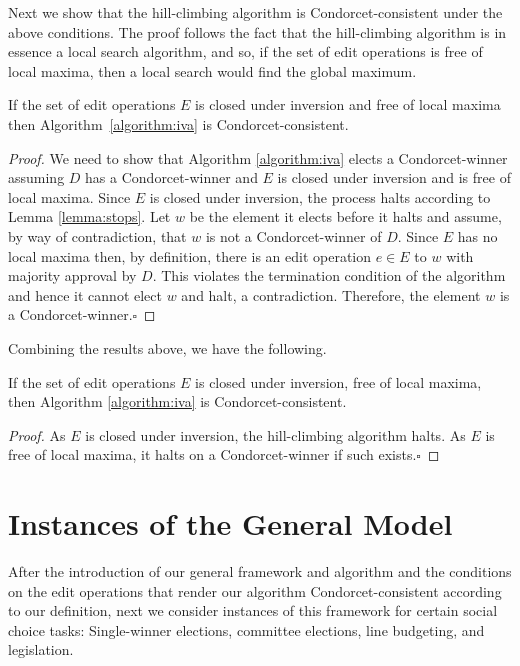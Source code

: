 \documentclass[sigconf]{aamas}  %
\newcommand{\qqed}{\hfill$\square$}
\begin{document}
Next we show that the hill-climbing algorithm is Condorcet-consistent under the above conditions. The proof follows the fact that the hill-climbing algorithm is in essence a local search algorithm, and so, if the set of edit operations is free of local maxima, then a local search would find the global maximum.

\begin{lemma}\label{lemma:IIAV-epsilon-condorcet}
If the set of edit operations $E$ is closed under inversion and free of local maxima then Algorithm~\ref{algorithm:iva} is Condorcet-consistent.
\end{lemma}

\begin{proof}
%
We need to show that Algorithm \ref{algorithm:iva} elects a Condorcet-winner assuming $D$ has a Condorcet-winner and $E$ is closed under inversion and is free of local maxima.
Since $E$ is closed under inversion, the process halts according to Lemma \ref{lemma:stops}.  Let $w$ be the element it elects before it halts and assume, by way of contradiction, that $w$ is not a Condorcet-winner of $D$.  Since $E$ has no local maxima then, by definition, there is an edit operation $e \in E$ to $w$ with majority approval by $D$.  This violates the termination condition of the algorithm and hence it cannot elect $w$ and halt, a contradiction.   Therefore, the element $w$ is a Condorcet-winner.\qqed
%
\end{proof}

Combining the results above, we have the following.

\begin{corollary}\label{corollary:IIAV--condorcet}
If the set of edit operations $E$ is closed under inversion, free of local maxima, then Algorithm \ref{algorithm:iva} is Condorcet-consistent.
\end{corollary}

\begin{proof}
%
As $E$ is closed under inversion, the hill-climbing algorithm halts. As $E$ is free of local maxima, it halts on a Condorcet-winner if such exists.\qqed
%
\end{proof}


\section{Instances of the General Model}

After the introduction of our general framework and algorithm and the conditions on the edit operations that render our algorithm Condorcet-consistent according to our definition, next we consider instances of this framework for certain social choice tasks:
  Single-winner elections,
  committee elections,
  line budgeting,
  and legislation.
  
\end{document}
